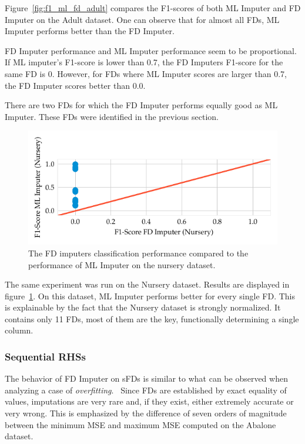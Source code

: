 Figure~\ref{fig:f1_ml_fd_adult} compares the F1-scores of both ML Imputer and FD Imputer on the Adult dataset.
One can observe that for almost all FDs, ML Imputer performs better than the FD Imputer.

FD Imputer performance and ML Imputer performance seem to be proportional.
If ML imputer's F1-score is lower than 0.7, the FD Imputers F1-score for the same FD is 0.
However, for FDs where ML Imputer scores are larger than 0.7, the FD Imputer scores better than 0.0.

There are two FDs for which the FD Imputer performs equally good as ML Imputer.
These FDs were identified in the previous section.

\begin{figure}[ht]
     \centering
     \includegraphics[width=\textwidth]{../figures/nursery/f1_ml_fd}
     \caption{The FD imputers classification performance compared to the performance of ML Imputer on the nursery dataset.}
     \label{fig:f1_ml_fd_nursery}
\end{figure}

The same experiment was run on the Nursery dataset.\cite{DUA19}
Results are displayed in figure~\ref{fig:f1_ml_fd_nursery}.
On this dataset, ML Imputer performs better for every single FD.
This is explainable by the fact that the Nursery dataset is strongly normalized.
It contains only 11 FDs, most of them are the key, functionally determining a single column.

\subsubsection{Sequential RHSs}
The behavior of FD Imputer on sFDs is similar to what can be observed when analyzing a case of \emph{overfitting}.~\cite[p.~56]{SMO08}
Since FDs are established by exact equality of values, imputations are very rare and, if they exist, either extremely accurate or very wrong.
This is emphasized by the difference of seven orders of magnitude between the minimum MSE and maximum MSE computed on the Abalone dataset.
